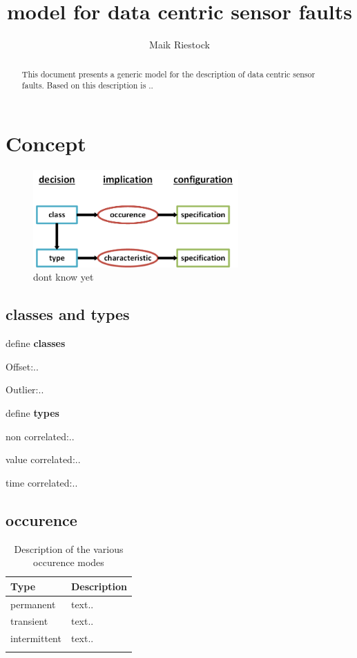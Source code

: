 \documentclass[a4paper,11pt]{article}
\title{model for data centric sensor faults}
\author{Maik Riestock}
\begin{document}
\maketitle
\tableofcontents

\begin{abstract}
This document presents a generic model for the description of data centric sensor faults. Based on this description is ..
\end{abstract}


\section{Concept}
 
 \begin{figure}[ht]
 	\centering
   \includegraphics[width=0.7\textwidth]{graphics/Zeichnung2.png}
 	\caption{dont know yet}
 	\label{fig:concept}
 \end{figure}
 
\subsection{classes and types}  

define \textbf{classes}

Offset:..

Outlier:..


define \textbf{types}

non correlated:..

value correlated:..

time correlated:..



\subsection{occurence}

\begin{table}[h]
    \begin{center}
        \begin{tabular}{l||l}
		Type 							& Description	\\
		\hline
		permanent			& text..	\\
		transient				& text..	\\
		intermittent				& text..	\\

	\\													
        \end{tabular}
        \caption{Description of the various occurence modes}
        \label{tab:typen}
    \end{center}
\end{table}
\end{document}
